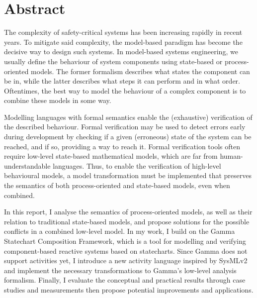 \vfill
\selectenglish


\chapter*{Abstract}

The complexity of safety-critical systems has been increasing rapidly in recent years. To mitigate said complexity, the model-based paradigm has become the decisive way to design such systems. In model-based systems engineering, we usually define the behaviour of system components using state-based or process-oriented models. The former formalism describes what states the component can be in, while the latter describes what steps it can perform and in what order. Oftentimes, the best way to model the behaviour of a complex component is to combine these models in some way. 

Modelling languages with formal semantics enable the (exhaustive) verification of the described behaviour. Formal verification may be used to detect errors early during development by checking if a given (erroneous) state of the system can be reached, and if so, providing a way to reach it. Formal verification tools often require low-level state-based mathematical models, which are far from human-understandable languages. Thus, to enable the verification of high-level behavioural models, a model transformation must be implemented that preserves the semantics of both process-oriented and state-based models, even when combined.  

In this report, I analyse the semantics of process-oriented models, as well as their relation to traditional state-based models, and propose solutions for the possible conflicts in a combined low-level model. In my work, I build on the Gamma Statechart Composition Framework, which is a tool for modelling and verifying component-based reactive systems based on statecharts. Since Gamma does not support activities yet, I introduce a new activity language inspired by SysMLv2 and implement the necessary transformations to Gamma’s low-level analysis formalism. Finally, I evaluate the conceptual and practical results through case studies and measurements then propose potential improvements and applications. 

\vfill
\cleardoublepage

\selectthesislanguage

\setcounter{romanPage}{\value{page}}
